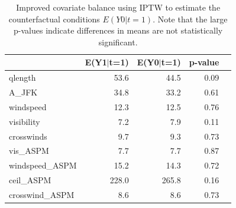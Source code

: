 \documentclass[conference]{IEEEtran}
\begin{document}
\begin{table}[ht]
\centering
\begin{tabular}{lrrrr}
  \hline
 & E(Y1$|$t=1) & \textbf{E(Y0$|$t=1)} & p-value \\ 
  \hline
qlength & 53.6 & 44.5 & 0.09  \\ 
  A\_JFK & 34.8 & 33.2 & 0.61 \\ 
  windspeed & 12.3 & 12.5 & 0.76 \\ 
  visibility & 7.2 & 7.9 & 0.11  \\ 
  crosswinds & 9.7 & 9.3 & 0.73  \\ 
  vis\_ASPM & 7.7 & 7.7 & 0.87  \\ 
  windspeed\_ASPM & 15.2 & 14.3 & 0.72  \\ 
  ceil\_ASPM & 228.0 & 265.8 & 0.16  \\ 
  crosswind\_ASPM & 8.6 & 8.6 & 0.73  \\ 
   \hline
\end{tabular}
\caption{Improved covariate balance using IPTW to estimate the counterfactual conditions $E(Y0|t=1)$.  Note that the large p-values indicate differences in means are not statistically significant.}
\label{tab:balance}
\end{table}
\end{document}
